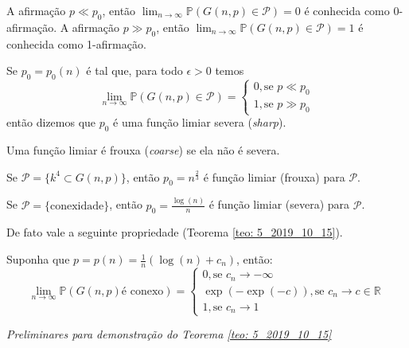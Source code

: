 A afirmação $p \ll p_0$, então $\lim_{n \rightarrow \infty} \mathbb{P}(G(n, p) \in \mathcal{P}) = 0$ é conhecida como 0-afirmação. A afirmação $p \gg p_0$, então $\lim_{n \rightarrow \infty} \mathbb{P}(G(n, p) \in \mathcal{P}) = 1$ é conhecida como 1-afirmação.

\begin{definicao}
Se $p_0 = p_0(n)$ é tal que, para todo $\epsilon > 0$ temos
\begin{equation*}
    \lim_{n \rightarrow \infty} \mathbb{P}(G(n, p) \in \mathcal{P}) = \begin{cases}
    0, \text{se } p \ll p_0 \\
    1, \text{se } p \gg p_0
    \end{cases}    
\end{equation*}
então dizemos que $p_0$ é uma função limiar severa (\emph{sharp}).
\end{definicao}


\begin{definicao}
Uma função limiar é frouxa (\emph{coarse}) se ela não é severa.
\end{definicao}

\begin{exemplo}
Se $\mathcal{P} = \{k ^4 \subset G(n,p)\}$, então $p_0 = n^{\frac{2}{3}}$ é função limiar (frouxa) para $\mathcal{P}$.
\end{exemplo}

\begin{exemplo}
Se $\mathcal{P} = \{\text{conexidade}\}$, então $p_0 = \frac{\log(n)}{n}$ é função limiar (severa) para $\mathcal{P}$.
\end{exemplo}

De fato vale a seguinte propriedade (Teorema \ref{teo: 5_2019_10_15}).
\begin{teorema}
\label{teo: 5_2019_10_15}
Suponha que $p = p(n) = \frac{1}{n}(\log(n) + c_n)$, então:
\begin{equation*}
    \lim_{n \rightarrow \infty} \mathbb{P}(G(n, p) \text{é conexo}) = \begin{cases}
    0, \text{se } c_n \rightarrow - \infty \\
    \exp(-\exp(-c)), \text{se } c_n \rightarrow c \in \mathbb{R} \\
    1, \text{se } c_n \rightarrow 1
    \end{cases}    
\end{equation*}
\end{teorema}

\emph{Preliminares para demonstração do Teorema \ref{teo: 5_2019_10_15}}

